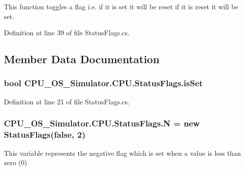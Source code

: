 This function toggles a flag i.\+e. if it is set it will be reset if it is reset it will be set. 



Definition at line 39 of file Status\+Flags.\+cs.



\subsection{Member Data Documentation}
\hypertarget{class_c_p_u___o_s___simulator_1_1_c_p_u_1_1_status_flags_a09019f0ab60c6be65f427e84bc488d6b}{}
\subsubsection[{is\+Set}]{\setlength{\rightskip}{0pt plus 5cm}bool C\+P\+U\+\_\+\+O\+S\+\_\+\+Simulator.\+C\+P\+U.\+Status\+Flags.\+is\+Set\hspace{0.3cm}{\ttfamily [private]}}\label{class_c_p_u___o_s___simulator_1_1_c_p_u_1_1_status_flags_a09019f0ab60c6be65f427e84bc488d6b}


Definition at line 21 of file Status\+Flags.\+cs.

\hypertarget{class_c_p_u___o_s___simulator_1_1_c_p_u_1_1_status_flags_a48a766c8a99690112570b884b09e9b10}{}
\subsubsection[{N}]{ C\+P\+U\+\_\+\+O\+S\+\_\+\+Simulator.\+C\+P\+U.\+Status\+Flags.\+N = new {\bf Status\+Flags}(false, 2)\hspace{0.3cm}{\ttfamily [static]}}\label{class_c_p_u___o_s___simulator_1_1_c_p_u_1_1_status_flags_a48a766c8a99690112570b884b09e9b10}


This variable represents the negative flag which is set when a value is less than zero (0) 



